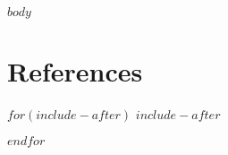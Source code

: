 \documentclass[12pt,article,oneside]{memoir}
\begin{document}
%


$body$


\section{References}
\setlength{\parindent}{-0.2in}
\setlength{\leftskip}{0.2in}
\setlength{\parskip}{8pt}
\vspace*{-0.2in}
\noindent

$for(include-after)$
$include-after$

$endfor$
\end{document}
